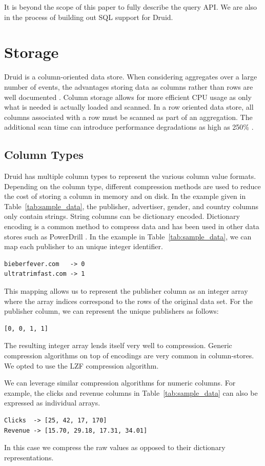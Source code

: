 \documentclass{vldb}
\begin{document}
It is beyond the scope of this paper to fully describe the query API.
We are also in the process of building out SQL support for Druid.

\section{Storage}
\label{sec:storage}
Druid is a column-oriented data store. When considering aggregates
over a large number of events, the advantages storing data as columns
rather than rows are well documented \cite{cattell2011scalable}. Column storage allows for
more efficient CPU usage as only what is needed is actually loaded and
scanned. In a row oriented data store, all columns associated with a
row must be scanned as part of an aggregation. The additional scan
time can introduce performance degradations as high as 250\% \cite{bear2012vertica}.

\subsection{Column Types}
Druid has multiple column types to represent the various column value
formats. Depending on the column type, different compression methods
are used to reduce the cost of storing a column in memory and on
disk. In the example given in Table~\ref{tab:sample_data}, the
publisher, advertiser, gender, and country columns only contain
strings. String columns can be dictionary encoded. Dictionary encoding
is a common method to compress data and has been used in other data
stores such as PowerDrill \cite{hall2012processing}. In the example in
Table~\ref{tab:sample_data}, we can map each publisher to an unique
integer identifier.
\begin{verbatim}
bieberfever.com   -> 0
ultratrimfast.com -> 1
\end{verbatim}
This mapping allows us to represent the publisher column as an integer
array where the array indices correspond to the rows of the original
data set. For the publisher column, we can represent the unique
publishers as follows:
\begin{verbatim}
[0, 0, 1, 1]
\end{verbatim}

The resulting integer array lends itself very well to
compression. Generic compression algorithms on top of encodings are
very common in column-stores. We opted to use the LZF \cite{liblzf2013} compression
algorithm.

We can leverage similar compression algorithms for numeric
columns. For example, the clicks and revenue columns in
Table~\ref{tab:sample_data} can also be expressed as individual
arrays.
\begin{verbatim}
Clicks  -> [25, 42, 17, 170]
Revenue -> [15.70, 29.18, 17.31, 34.01]
\end{verbatim}
In this case we compress the raw values as opposed to their dictionary
representations.
\end{document}
